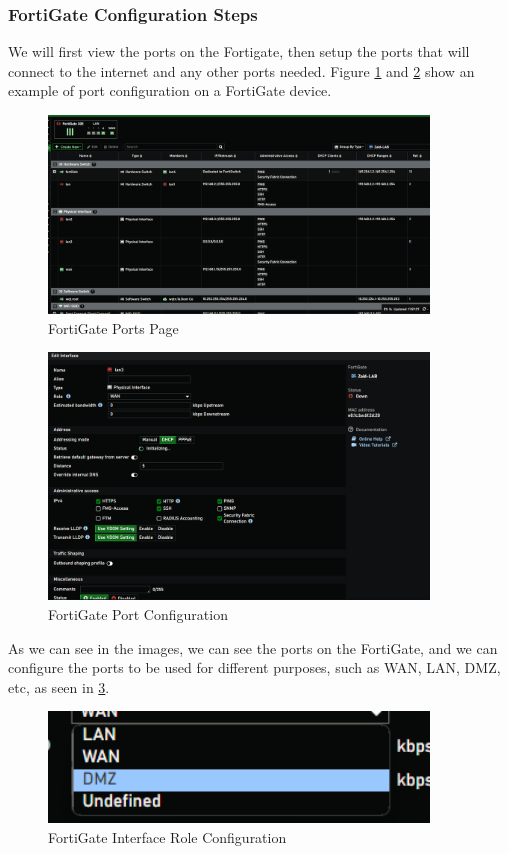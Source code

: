 \documentclass[12pt]{report}
\begin{document}
\subsubsection{FortiGate Configuration Steps}
We will first view the ports on the Fortigate, then setup the ports that will connect to the internet and any other ports needed. Figure \ref{fig:ports} and \ref{fig:portscfg} show an example of port configuration on a FortiGate device.
\begin{figure}
    \centering
    \includegraphics[width=0.9\textwidth]{images/Implementation/ports.png}
    \caption{FortiGate Ports Page}
    \label{fig:ports}
\end{figure}
\begin{figure}
    \centering
    \includegraphics[width=0.9\textwidth]{images/Implementation/portconfig.png}
    \caption{FortiGate Port Configuration}
    \label{fig:portscfg}
\end{figure}
As we can see in the images, we can see the ports on the FortiGate, and we can configure the ports to be used for different purposes, such as WAN, LAN, DMZ, etc, as seen in \ref{fig:intrfsrole}.
\begin{figure}
    \centering
    \includegraphics[width=0.9\textwidth]{images/Implementation/intrfsrole.png}
    \caption{FortiGate Interface Role Configuration}
    \label{fig:intrfsrole}
\end{figure}
\end{document}
